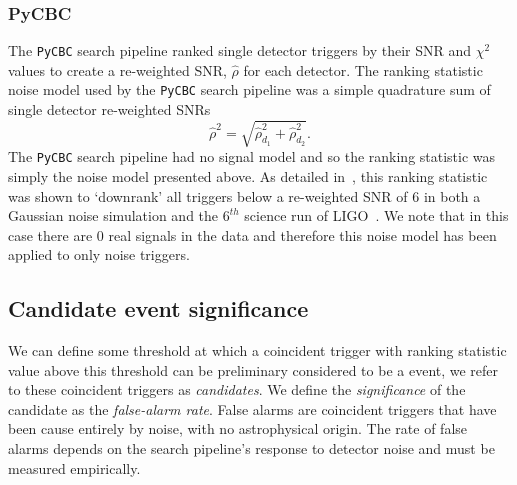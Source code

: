 \subsubsection{\label{2:sec:pycbc-2016}PyCBC}

The \texttt{PyCBC} search pipeline ranked single detector triggers by their SNR and $\chi^{2}$ values to create a re-weighted SNR, $\hat{\rho}$ for each detector. The ranking statistic noise model used by the \texttt{PyCBC} search pipeline was a simple quadrature sum of single detector re-weighted SNRs
%
\begin{equation}
    \hat{\rho}^{2} = \sqrt{\hat{\rho}^{2}_{d_{1}} + \hat{\rho}^{2}_{d_{2}}}.
    \label{2:eq:PyCBC_noise_model}
\end{equation}
%
The \texttt{PyCBC} search pipeline had no signal model and so the ranking statistic was simply the noise model presented above. As detailed in~\cite{PyCBC:2016}, this ranking statistic was shown to `downrank' all triggers below a re-weighted SNR of $6$ in both a Gaussian noise simulation and the $6^{th}$ science run of LIGO~\cite{rw_snr_eq:2012}. We note that in this case there are $0$ real signals in the data and therefore this noise model has been applied to only noise triggers.

\subsection{\label{2:sec:background-estimation}Candidate event significance}

We can define some threshold at which a coincident trigger with ranking statistic value above this threshold can be preliminary considered to be a \gwadj event, we refer to these coincident triggers as \textit{candidates}. We define the \textit{significance} of the candidate as the \textit{false-alarm rate}. False alarms are coincident triggers that have been cause entirely by noise, with no astrophysical origin. The rate of false alarms depends on the search pipeline's response to detector noise and must be measured empirically.

